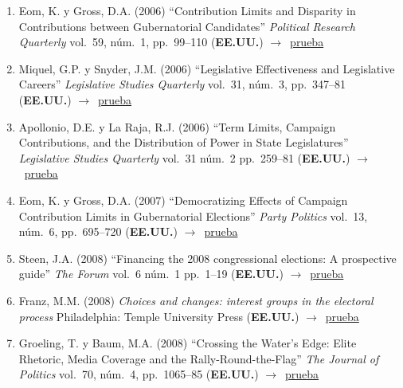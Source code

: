 \documentclass[12 pt, letter]{article}
\newenvironment{CitasMiTrabajo}{
    \begin{footnotesize}
    \begin{enumerate}[label={\footnotesize\emph{cita~\arabic*}},ref=\arabic*] %
        \setlength{\itemsep}{.1\itemsep}
        \setlength{\parskip}{.1\parskip}
    }{\end{enumerate}\end{footnotesize}}
\begin{document}
\begin{CitasMiTrabajo}
        \item Eom, K. y Gross, D.A. (2006)
        ``Contribution Limits and Disparity in Contributions between
        Gubernatorial Candidates'' \emph{Political Research Quarterly} vol.\ 59, n\'um.\
        1, pp.\ 99--110  (\textbf{EE.UU.}) $\rightarrow$~\href{http://ericmagar.com/cv/cites/coxMagar/eom1.pdf}{prueba}

        \item Miquel, G.P. y Snyder, J.M. (2006)
        ``Legislative
        Effectiveness and Legislative Careers'' \emph{Legislative Studies
        Quarterly} vol.\ 31, n\'um.\ 3, pp.\ 347--81 (\textbf{EE.UU.}) $\rightarrow$~\href{http://ericmagar.com/cv/cites/coxMagar/padro.pdf}{prueba}

       \item Apollonio, D.E. y La Raja, R.J. (2006) ``Term Limits, Campaign Contributions, and the Distribution of Power in State Legislatures'' \emph{Legislative Studies Quarterly} vol.\ 31 n\'um.\ 2 pp.\ 259--81 (\textbf{EE.UU.}) $\rightarrow$~\href{http://ericmagar.com/cv/cites/coxMagar/apollonio+laraja2006lsq.pdf}{prueba}

        \item Eom, K. y Gross, D.A. (2007)
        ``Democratizing Effects of Campaign Contribution Limits in Gubernatorial Elections'' \emph{Party Politics} vol.\ 13, n\'um.\ 6, pp.\ 695--720
        (\textbf{EE.UU.}) $\rightarrow$~\href{http://ericmagar.com/cv/cites/coxMagar/eom2.pdf}{prueba}

       \item Steen, J.A. (2008) ``Financing the 2008 congressional elections: A prospective guide'' \emph{The Forum} vol.\ 6 n\'um.\ 1 pp.\ 1--19 (\textbf{EE.UU.}) $\rightarrow$~\href{http://ericmagar.com/cv/cites/coxMagar/steen2008.pdf}{prueba}

        \item Franz, M.M. (2008)
        \emph{Choices and changes:
        interest groups in the electoral process}
        Philadelphia: Temple University Press (\textbf{EE.UU.}) $\rightarrow$~\href{http://ericmagar.com/cv/cites/coxMagar/franz.pdf}{prueba}

        \item Groeling, T. y Baum, M.A. (2008)
        ``Crossing the Water's Edge: Elite Rhetoric,
        Media Coverage and the Rally-Round-the-Flag'' \emph{The Journal of Politics} vol.\ 70,
        n\'um.\ 4, pp.\ 1065--85 (\textbf{EE.UU.}) $\rightarrow$~\href{http://ericmagar.com/cv/cites/coxMagar/groe.pdf}{prueba}


\end{CitasMiTrabajo}
\end{document}
